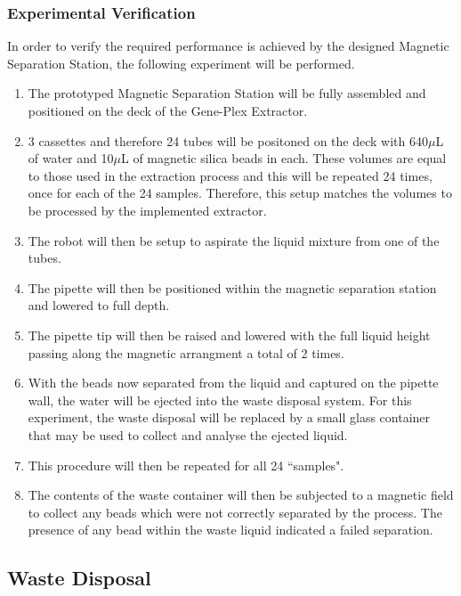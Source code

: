 \subsubsection{Experimental Verification}

In order to verify the required performance is achieved by the designed Magnetic Separation Station, the following experiment will be performed.

\begin{enumerate}
	\item The prototyped Magnetic Separation Station will be fully assembled and positioned on the deck of the Gene-Plex Extractor.
	\item 3 cassettes and therefore 24 tubes will be positoned on the deck with 640$\mu$L of water and 10$\mu$L of magnetic silica beads in each. These volumes are equal to those used in the extraction process and this will be repeated 24 times, once for each of the 24 samples. Therefore, this setup matches the volumes to be processed by the implemented extractor.
	\item The robot will then be setup to aspirate the liquid mixture from one of the tubes.
	\item The pipette will then be positioned within the magnetic separation station and lowered to full depth. 
	\item The pipette tip will then be raised and lowered with the full liquid height passing along the magnetic arrangment a total of 2 times.
	\item With the beads now separated from the liquid and captured on the pipette wall, the water will be ejected into the waste disposal system. For this experiment, the waste disposal will be replaced by a small glass container that may be used to collect and analyse the ejected liquid.
	\item This procedure will then be repeated for all 24 ``samples".
	\item The contents of the waste container will then be subjected to a magnetic field to collect any beads which were not correctly separated by the process. The presence of any bead within the waste liquid indicated a failed separation.
\end{enumerate}

\subsection{Waste Disposal}

